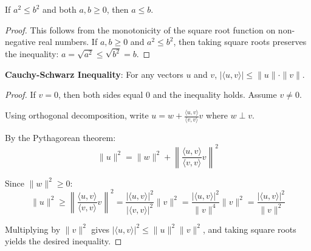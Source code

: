 \begin{theorem}
  \label{theorem : le_of_sq_le_sq}
  \leanok
  If $a^2 \leq b^2$ and both $a, b \geq 0$, then $a \leq b$.
\end{theorem}
\begin{proof}
  This follows from the monotonicity of the square root function on non-negative real numbers. If $a, b \geq 0$ and $a^2 \leq b^2$, then taking square roots preserves the inequality: $a = \sqrt{a^2} \leq \sqrt{b^2} = b$.
\end{proof}

\begin{theorem}
  \label{theorem : Cauchy_Schwarz}
  \leanok
  \textbf{Cauchy-Schwarz Inequality}: For any vectors $u$ and $v$, $|\langle u, v \rangle| \leq \|u\| \cdot \|v\|$.
\end{theorem}
\begin{proof}
  If $v = 0$, then both sides equal $0$ and the inequality holds. Assume $v \neq 0$.
  
  Using orthogonal decomposition, write $u = w + \frac{\langle u, v \rangle}{\langle v, v \rangle} v$ where $w \perp v$.
  
  By the Pythagorean theorem:
  $$\|u\|^2 = \|w\|^2 + \left\|\frac{\langle u, v \rangle}{\langle v, v \rangle} v\right\|^2$$
  
  Since $\|w\|^2 \geq 0$:
  $$\|u\|^2 \geq \left\|\frac{\langle u, v \rangle}{\langle v, v \rangle} v\right\|^2 = \frac{|\langle u, v \rangle|^2}{|\langle v, v \rangle|^2} \|v\|^2 = \frac{|\langle u, v \rangle|^2}{\|v\|^4} \|v\|^2 = \frac{|\langle u, v \rangle|^2}{\|v\|^2}$$
  
  Multiplying by $\|v\|^2$ gives $|\langle u, v \rangle|^2 \leq \|u\|^2 \|v\|^2$, and taking square roots yields the desired inequality.
\end{proof}

